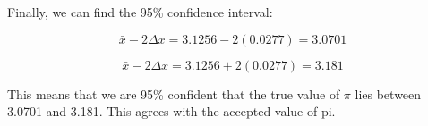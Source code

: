 \begin{mdframed}[backgroundcolor=blue!10!white]
Finally, we can find the 95\% confidence interval:

\begin{equation*}
	\bar{x} - 2 \Delta x = 3.1256 - 2 (0.0277) = \boxed{3.0701}
\end{equation*}

\begin{equation*}
	\bar{x} - 2 \Delta x = 3.1256 + 2 (0.0277) = \boxed{3.181}
\end{equation*}

This means that we are 95\% confident that the true value of $\pi$ lies between 3.0701 and 3.181.  This agrees with the accepted value of pi.

	\end{mdframed}
	

  